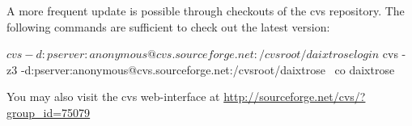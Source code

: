 A more frequent update is possible through checkouts of the cvs repository.  The
following commands are sufficient to check out the latest version:

\begin{code}
  $ cvs -d:pserver:anonymous@cvs.sourceforge.net:/cvsroot/daixtrose login 
  $ cvs -z3 -d:pserver:anonymous@cvs.sourceforge.net:/cvsroot/daixtrose \
    co daixtrose 
\end{code}


You may also visit the cvs web-interface at
\url{http://sourceforge.net/cvs/?group_id=75079}





